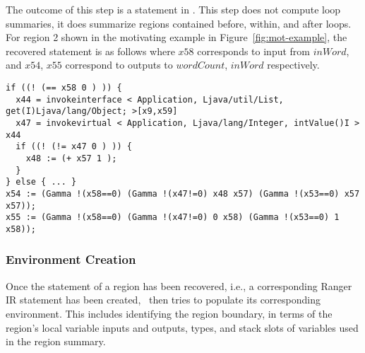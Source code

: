 %
The outcome of this step is a statement in \tool.
%
This step does not compute loop summaries, it does summarize regions contained before, within, and after loops.
%
For region 2 shown in the motivating example in Figure~\ref{fig:mot-example}, the recovered statement is as follows where
$x58$ corresponds to input from $inWord$, and $x54$, $x55$ correspond to outputs to $wordCount$,
$inWord$ respectively.\\
%
\begin{lstlisting}[numbers=none]
if ((! (== x58 0 ) )) {
  x44 = invokeinterface < Application, Ljava/util/List, get(I)Ljava/lang/Object; >[x9,x59]
  x47 = invokevirtual < Application, Ljava/lang/Integer, intValue()I > x44
  if ((! (!= x47 0 ) )) {
    x48 := (+ x57 1 );
  }
} else { ... }
x54 := (Gamma !(x58==0) (Gamma !(x47!=0) x48 x57) (Gamma !(x53==0) x57 x57));
x55 := (Gamma !(x58==0) (Gamma !(x47!=0) 0 x58) (Gamma !(x53==0) 1 x58));

\end{lstlisting}
\subsubsection{Environment Creation}

Once the statement of a region has been recovered, i.e., a corresponding Ranger IR statement has been created, \toolshort\ then tries to populate its corresponding environment.
%
This includes identifying the region boundary, in terms of the region\rq s local variable inputs and outputs, types, and stack
slots of variables used in the region summary.
%
%
%


